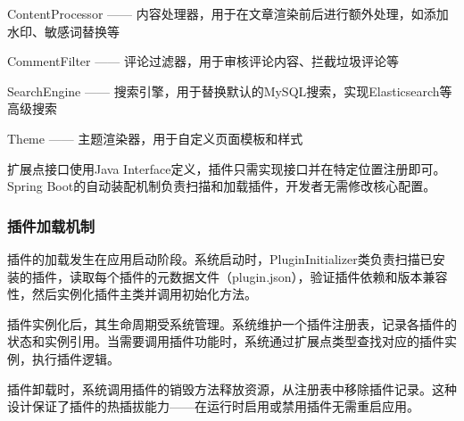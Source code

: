 \documentclass[UTF8,AutoFakeBold=1,AutoFakeSlant,zihao=-4]{SCAU}
\begin{document}
 ContentProcessor —— 内容处理器，用于在文章渲染前后进行额外处理，如添加水印、敏感词替换等

 CommentFilter —— 评论过滤器，用于审核评论内容、拦截垃圾评论等

 SearchEngine —— 搜索引擎，用于替换默认的MySQL搜索，实现Elasticsearch等高级搜索

 Theme —— 主题渲染器，用于自定义页面模板和样式

 扩展点接口使用Java Interface定义，插件只需实现接口并在特定位置注册即可。Spring Boot的自动装配机制负责扫描和加载插件，开发者无需修改核心配置。

 \subsubsection{插件加载机制}

 插件的加载发生在应用启动阶段。系统启动时，PluginInitializer类负责扫描已安装的插件，读取每个插件的元数据文件（plugin.json），验证插件依赖和版本兼容性，然后实例化插件主类并调用初始化方法。

 插件实例化后，其生命周期受系统管理。系统维护一个插件注册表，记录各插件的状态和实例引用。当需要调用插件功能时，系统通过扩展点类型查找对应的插件实例，执行插件逻辑。

插件卸载时，系统调用插件的销毁方法释放资源，从注册表中移除插件记录。这种设计保证了插件的热插拔能力——在运行时启用或禁用插件无需重启应用。
\end{document}
